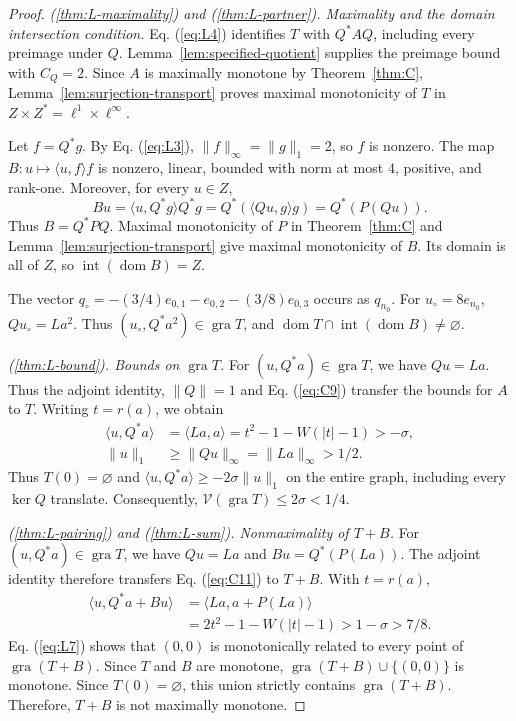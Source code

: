 \documentclass[11pt]{article}
\newcommand{\gra}{\operatorname{gra}}
\newcommand{\dom}{\operatorname{dom}}
\newcommand{\pair}[2]{\langle #1,#2\rangle}
\theoremstyle{definition}
\theoremstyle{remark}
\begin{document}
\begin{proof}
\noindent\textit{\textup{(\ref{thm:L-maximality})} and \textup{(\ref{thm:L-partner})}. Maximality and the domain intersection condition.}
Eq. (\ref{eq:L4}) identifies $T$ with $Q^*AQ$, including every preimage under $Q$. Lemma~\ref{lem:specified-quotient} supplies the preimage bound with $C_Q=2$. Since $A$ is maximally monotone by Theorem~\ref{thm:C}, Lemma~\ref{lem:surjection-transport} proves maximal monotonicity of $T$ in $Z\times Z^*=\ell^1\times\ell^\infty$.

\label{sec:L4}
Let $f=Q^*g$. By Eq. (\ref{eq:L3}), $\|f\|_\infty=\|g\|_1=2$, so $f$ is nonzero. The map $B:u\mapsto\pair{u}{f}f$ is nonzero, linear, bounded with norm at most $4$, positive, and rank-one. Moreover, for every $u\in Z$,
\[
Bu=\pair{u}{Q^*g}Q^*g
   =Q^*(\pair{Qu}{g}g)
   =Q^*(P(Qu)).
\]
Thus $B=Q^*PQ$. Maximal monotonicity of $P$ in Theorem~\ref{thm:C} and Lemma~\ref{lem:surjection-transport} give maximal monotonicity of $B$. Its domain is all of $Z$, so $\operatorname{int}(\dom B)=Z$.

The vector $q_\circ=-(3/4)e_{0,1}-e_{0,2}-(3/8)e_{0,3}$ occurs as $q_{n_0}$. For $u_\circ=8e_{n_0}$, $Qu_\circ=La^2$. Thus $(u_\circ,Q^*a^2)\in\gra T$, and $\dom T\cap\operatorname{int}(\dom B)\ne\varnothing$.

\noindent\textit{\textup{(\ref{thm:L-bound})}. Bounds on $\gra T$.}
\label{sec:L3}
For $(u,Q^*a)\in\gra T$, we have $Qu=La$. Thus the adjoint identity, $\|Q\|=1$ and Eq. (\ref{eq:C9}) transfer the bounds for $A$ to $T$. Writing $t=r(a)$, we obtain
\begin{equation}
\begin{aligned}
\pair{u}{Q^*a}&=\pair{La}{a}
 =t^2-1-W(|t|-1)>-\sigma,\\
\|u\|_1&\ge\|Qu\|_\infty=\|La\|_\infty>1/2.
\end{aligned}
\label{eq:L6}
\end{equation}
Thus $T(0)=\varnothing$ and $\pair{u}{Q^*a}\ge-2\sigma\|u\|_1$ on the entire graph, including every $\ker Q$ translate. Consequently, $\mathcal V(\gra T)\le2\sigma<1/4$.

\noindent\textit{\textup{(\ref{thm:L-pairing})} and \textup{(\ref{thm:L-sum})}. Nonmaximality of $T+B$.}
\label{sec:L5}
For $(u,Q^*a)\in\gra T$, we have $Qu=La$ and $Bu=Q^*(P(La))$. The adjoint identity therefore transfers Eq. (\ref{eq:C11}) to $T+B$. With $t=r(a)$,
\begin{equation}
\begin{aligned}
\pair{u}{Q^*a+Bu}
 &=\pair{La}{a+P(La)}\\
 &=2t^2-1-W(|t|-1)>1-\sigma>7/8.
\end{aligned}
\label{eq:L7}
\end{equation}
Eq. (\ref{eq:L7}) shows that $(0,0)$ is monotonically related to every point of $\gra(T+B)$. Since $T$ and $B$ are monotone, $\gra(T+B)\cup\{(0,0)\}$ is monotone. Since $T(0)=\varnothing$, this union strictly contains $\gra(T+B)$. Therefore, $T+B$ is not maximally monotone.
\end{proof}
\end{document}
